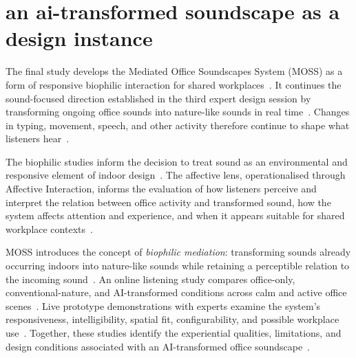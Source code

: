 
\section{an ai-transformed soundscape as a design instance} The final study develops the Mediated Office Soundscapes System (MOSS) as a form of responsive biophilic interaction for shared workplaces~\cite{rao2027biophilic}. It continues the sound-focused direction established in the third expert design session by transforming ongoing office sounds into nature-like sounds in real time~\cite{rao2027biophilic}. Changes in typing, movement, speech, and other activity therefore continue to shape what listeners hear~\cite{rao2027biophilic}.

The biophilic studies inform the decision to treat sound as an environmental and responsive element of indoor design~\cite{rao2025designing,rao2026biophilic}. The affective lens, operationalised through Affective Interaction, informs the evaluation of how listeners perceive and interpret the relation between office activity and transformed sound, how the system affects attention and experience, and when it appears suitable for shared workplace contexts~\cite{rao2026emotion}.

MOSS introduces the concept of \emph{biophilic mediation}: transforming sounds already occurring indoors into nature-like sounds while retaining a perceptible relation to the incoming sound~\cite{rao2027biophilic}. An online listening study compares office-only, conventional-nature, and AI-transformed conditions across calm and active office scenes~\cite{rao2027biophilic}. Live prototype demonstrations with experts examine the system's responsiveness, intelligibility, spatial fit, configurability, and possible workplace use~\cite{rao2027biophilic}. Together, these studies identify the experiential qualities, limitations, and design conditions associated with an AI-transformed office soundscape~\cite{rao2027biophilic}.


